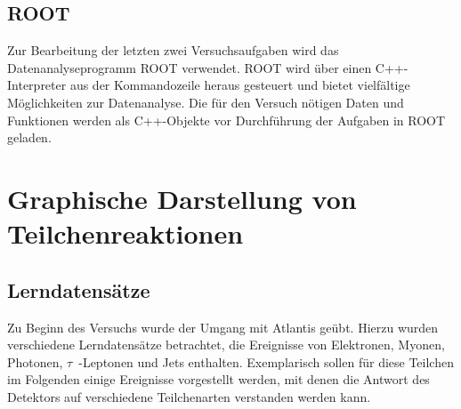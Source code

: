 \documentclass[11pt, a4paper]{article}
\numberwithin{equation}{section}
\begin{document}
\subsection{ROOT}
Zur Bearbeitung der letzten zwei Versuchsaufgaben wird das Datenanalyseprogramm ROOT verwendet.
ROOT wird über einen C++-Interpreter aus der Kommandozeile heraus gesteuert und bietet vielfältige Möglichkeiten zur Datenanalyse.
Die für den Versuch nötigen Daten und Funktionen werden als C++-Objekte vor Durchführung der Aufgaben in ROOT geladen.


\section{Graphische Darstellung von Teilchenreaktionen}

\subsection{Lerndatensätze}

Zu Beginn des Versuchs wurde der Umgang mit Atlantis geübt.
Hierzu wurden verschiedene Lerndatensätze betrachtet, die Ereignisse von Elektronen, Myonen, Photonen, $\tau$~-Leptonen und Jets enthalten.
Exemplarisch sollen für diese Teilchen im Folgenden einige Ereignisse vorgestellt werden, mit denen die Antwort des Detektors auf verschiedene Teilchenarten verstanden werden kann.

\clearpage
\end{document}
